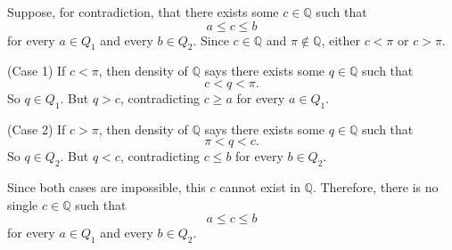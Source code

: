 \documentclass[12pt]{article}
\begin{document}
\begin{enumerate}
            Suppose, for contradiction, that there exists some $c \in \mathbb{Q}$ such that
            \[
                  a \leq c \leq b
            \]
            for every $a \in Q_1$ and every $b \in Q_2$.
            Since $c \in \mathbb{Q}$ and $\pi \notin \mathbb{Q}$, either $c < \pi$ or $c > \pi$.

            (Case 1) If $c < \pi$, then density of $\mathbb{Q}$ says there exists some $q \in \mathbb{Q}$ such that
            \[
                  c < q < \pi.
            \]
            So $q \in Q_1$.
            But $q > c$, contradicting $c \geq a$ for every $a \in Q_1$.

            (Case 2) If $c > \pi$, then density of $\mathbb{Q}$ says there exists some $q \in \mathbb{Q}$ such that
            \[
                  \pi < q < c.
            \]
            So $q \in Q_2$.
            But $q < c$, contradicting $c \leq b$ for every $b \in Q_2$.

            Since both cases are impossible, this $c$ cannot exist in $\mathbb{Q}$.
            Therefore,  there is no single $c \in \mathbb{Q}$ such that
            \[
                  a \leq c \leq b
            \]
            for every $a \in Q_1$ and every $b \in Q_2$.

\end{enumerate}
\end{document}
